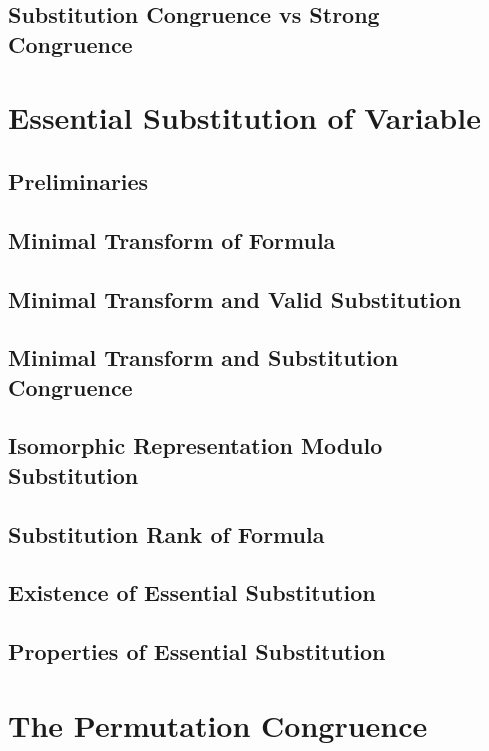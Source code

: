 \documentclass{report}
\begin{document}
    \subsection{Substitution Congruence vs Strong Congruence}
      
\section{Essential Substitution of Variable}
    \subsection{Preliminaries}
      
    \subsection{Minimal Transform of Formula}
      
    \subsection{Minimal Transform and Valid Substitution}
      
    \subsection{Minimal Transform and Substitution Congruence}
      
    \subsection{Isomorphic Representation Modulo Substitution}
      
    \subsection{Substitution Rank of Formula}
      
    \subsection{Existence of Essential Substitution}
      
    \subsection{Properties of Essential Substitution}
      
\section{The Permutation Congruence}
\end{document}
